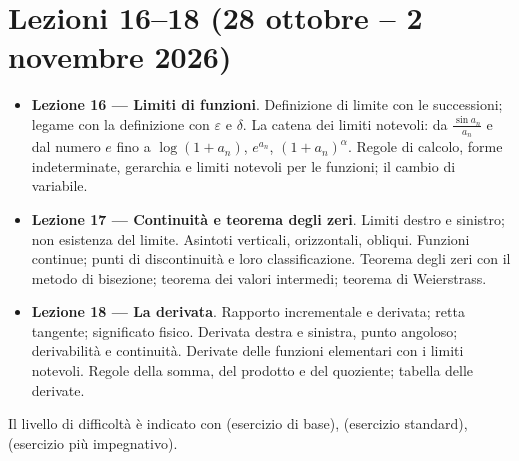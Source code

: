 \chapter{Lezioni 16--18 (28 ottobre -- 2 novembre 2026)}

\begin{vuoto}{}
\begin{itemize}
\item[\bul] \textbf{Lezione 16 --- Limiti di funzioni}. Definizione di limite con le successioni; legame con la definizione con $\varepsilon$ e $\delta$. La catena dei limiti notevoli: da $\frac{\sin a_n}{a_n}$ e dal numero $e$ fino a $\log(1+a_n)$, $e^{a_n}$, $(1+a_n)^\alpha$. Regole di calcolo, forme indeterminate, gerarchia e limiti notevoli per le funzioni; il cambio di variabile.
\item[\bul] \textbf{Lezione 17 --- Continuità e teorema degli zeri}. Limiti destro e sinistro; non esistenza del limite. Asintoti verticali, orizzontali, obliqui. Funzioni continue; punti di discontinuità e loro classificazione. Teorema degli zeri con il metodo di bisezione; teorema dei valori intermedi; teorema di Weierstrass.
\item[\bul] \textbf{Lezione 18 --- La derivata}. Rapporto incrementale e derivata; retta tangente; significato fisico. Derivata destra e sinistra, punto angoloso; derivabilità e continuità. Derivate delle funzioni elementari con i limiti notevoli. Regole della somma, del prodotto e del quoziente; tabella delle derivate.
\end{itemize}
\end{vuoto}

Il livello di difficoltà è indicato con  (esercizio di base),  (esercizio standard),  (esercizio più impegnativo).


